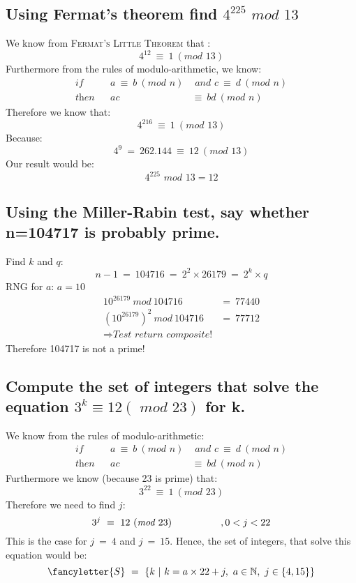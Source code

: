 \documentclass{report}
\begin{document}
		\subsection{Using Fermat’s theorem find $4^{225} \textit{ mod } 13$}
		\startsubsection
			We know from \textsc{Fermat's Little Theorem} that :
			\[
				4^{12} \ \equiv \ 1 \ (\textit{mod } 13)
			\]
			Furthermore from the rules of modulo-arithmetic, we know:
			\begin{align*}
				\textit{if} && a \ \equiv \ b \ (\textit{mod } n) &\textit{ and } c \ \equiv \ d \ (\textit{mod } n) \\
				\textit{then} && ac \ &\equiv \ bd \ (\textit{mod } n)
			\end{align*}
			Therefore we know that:
			\[
				4^{216} \ \equiv \ 1 \ (\textit{mod } 13)
			\]
			Because:
			\[
				4^{9} \ = \ 262.144 \ \equiv \ 12 \ (\textit{mod } 13)
			\]
			Our result would be:
			\[
				4^{225} \textit{ mod } 13 = 12
			\]
		\closesection
		\subsection{Using the Miller-Rabin test, say whether n=104717 is probably prime.}
		\startsubsection
			Find $k$ and $q$:
			\[
				n-1 \ = \ 104716 \ = \ 2^2 \times 26179 \ = \ 2^k \times q
			\]
			RNG for $a$: $a = 10$
			\begin{align*}
				10^{26179} \ mod \ 104716 \ & = \ 77440 \\
				(10^{26179})^2 \ mod \ 104716 \ & = \ 77712 \\
				\Rightarrow \textit{Test return composite!}
			\end{align*}
			Therefore 104717 is not a prime!
		\closesection
		\subsection{Compute the set of integers that solve the equation $3^k \equiv 12 (\textit{ mod } 23)$ for k.}
		\startsubsection
			We know from the rules of modulo-arithmetic:
			\begin{align*}
				\textit{if} && a \ \equiv \ b \ (\textit{mod } n) &\textit{ and } c \ \equiv \ d \ (\textit{mod } n) \\
				\textit{then} && ac \ &\equiv \ bd \ (\textit{mod } n)
			\end{align*}
			Furthermore we know (because 23 is prime) that:
			\[
				3^{22} \ \equiv \ 1 \ (\textit{mod } 23)
			\]
			Therefore we need to find $j$:
			\[
				3^{j} \ \equiv \ 12 \ (\textit{mod } 23) \hspace*{5em}, 0 < j < 22
			\]
			This is the case for $j \ = \ 4$ and $j \ = \ 15$. Hence, the set of integers, that solve this equation would be:
			\[
				\fancyletter{S} \ = \ \{k \ | \ k = a \times 22 + j, \ a \in \mathbb{N}, \ j \in \{ 4, 15 \} \}
			\]
		\closesection
	\closesection
\end{document}
